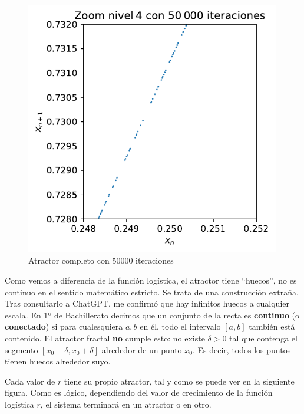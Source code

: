 \documentclass[
  10pt,
  a4paper,
  DIV=11,
  numbers=noendperiod,
  open=any]{scrreprt}
\numberwithin{equation}{chapter}
\numberwithin{equation}{section}
\renewcommand{\[}{\begin{equation}}
\renewcommand{\]}{\end{equation}}
\begin{document}
\begin{figure}[h]
  \centering
  \includegraphics[width=0.99\textwidth]{04-clima/atractor_files/figure-pdf/cell-6-output-5.pdf}
  \caption{Atractor completo con 50000 iteraciones}
\end{figure}



Como vemos a diferencia de la función logística, el atractor tiene
``huecos'', no es continuo en el sentido matemático estricto. Se trata
de una construcción extraña. Tras consultarlo a ChatGPT, me confirmó que
hay infinitos huecos a cualquier escala. En 1º de Bachillerato decimos
que un conjunto de la recta es \textbf{continuo} (o \textbf{conectado})
si para cualesquiera \(a,b\) en él, todo el intervalo \([a,b]\) también
está contenido. El atractor fractal \textbf{no} cumple esto: no existe
\(\delta>0\) tal que contenga el segmento \([x_0-\delta, x_0+\delta]\)
alrededor de un punto \(x_0\). Es decir, todos los puntos tienen huecos
alrededor suyo.

Cada valor de \(r\) tiene su propio atractor, tal y como se puede ver en
la siguiente figura. Como es lógico, dependiendo del valor de
crecimiento de la función logística \(r\), el sistema terminará en un
atractor o en otro.
\end{document}
